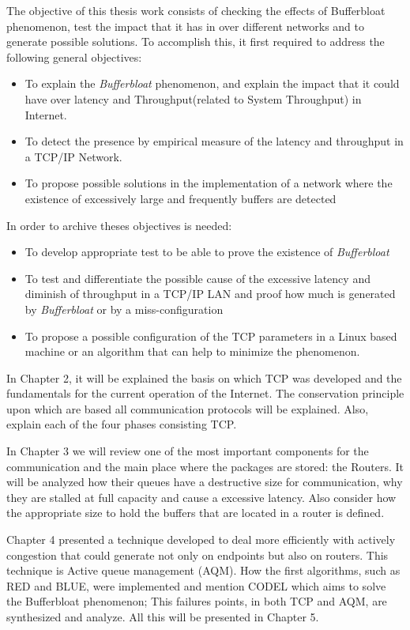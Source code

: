The objective of this thesis work consists of checking the effects of
Bufferbloat phenomenon, test the impact that it has in over different networks
and to generate possible solutions. To accomplish this, it first required to
address the following general objectives:

\begin{itemize}
	\item To explain the \textit{Bufferbloat} phenomenon, and explain the impact that it could have over latency and \gls{Throughput}(related to \gls{System Throughput}) in Internet.
	\item To detect the presence by empirical measure of the latency and throughput in a TCP/IP Network.
	\item To propose possible solutions in the implementation of a network where the existence of excessively large and frequently buffers are detected
\end{itemize}

In order to archive theses objectives is needed:

\begin{itemize}
\item To develop appropriate test to be able to prove the existence of \textit{Bufferbloat}
\item To test and differentiate the possible cause of the excessive latency and diminish of throughput in a TCP/IP LAN and proof how much is generated by \textit{Bufferbloat} or by a miss-configuration
\item To propose a possible configuration of the TCP parameters in a Linux based machine or an algorithm that can help to minimize the phenomenon.
\end{itemize}

In Chapter 2, it will be explained the basis on which TCP was developed and
the fundamentals for the current operation of the Internet. The conservation
principle upon which are based all communication protocols will be explained.
Also, explain each of the four phases consisting TCP.

In Chapter 3 we will review one of the most important components for the
communication and the main place where the packages are stored: the Routers.
It will be analyzed how their queues have a destructive size for
communication, why they are stalled at full capacity and cause a excessive
latency. Also consider how the appropriate size to hold the buffers that are
located in a router is defined.

Chapter 4 presented a technique developed to deal more efficiently with
actively congestion that could generate not only on endpoints but also on
routers. This technique is Active queue management (AQM). How the first
algorithms, such as RED and BLUE, were implemented and mention
CODEL which aims to solve the Bufferbloat phenomenon; This failures points,
in both TCP and AQM, are synthesized and analyze. All this will be presented in
Chapter 5.

